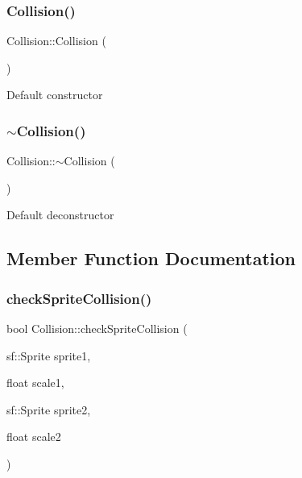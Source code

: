 \subsubsection{\texorpdfstring{Collision()}{Collision()}}
{\footnotesize\ttfamily Collision\+::\+Collision (\begin{DoxyParamCaption}{ }\end{DoxyParamCaption})\hspace{0.3cm}{\ttfamily [default]}}

Default constructor \mbox{\label{class_collision_aeb427d5296152744ac2c082d29afa930}} 
\subsubsection{\texorpdfstring{$\sim$Collision()}{~Collision()}}
{\footnotesize\ttfamily Collision\+::$\sim$\+Collision (\begin{DoxyParamCaption}{ }\end{DoxyParamCaption})\hspace{0.3cm}{\ttfamily [default]}}

Default deconstructor 

\subsection{Member Function Documentation}
\mbox{\label{class_collision_aae61d9a3d12eaafb20bb9f08906bb062}} 
\subsubsection{\texorpdfstring{checkSpriteCollision()}{checkSpriteCollision()}}
{\footnotesize\ttfamily bool Collision\+::check\+Sprite\+Collision (\begin{DoxyParamCaption}\item[{sf\+::\+Sprite}]{sprite1,  }\item[{float}]{scale1,  }\item[{sf\+::\+Sprite}]{sprite2,  }\item[{float}]{scale2 }\end{DoxyParamCaption})\hspace{0.3cm}{\ttfamily [static]}}

